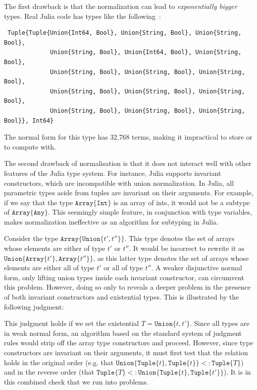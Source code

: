 \documentclass[a4paper,english]{lipics-v2019}
\newcommand{\xt}[1]{\texttt{#1}}
\newcommand{\union}[2]{\xt{Union\{}#1,#2\xt{\}}}
\newcommand{\tuple}[1]{\xt{Tuple\{}#1\xt{\}}}
\newcommand{\arrayt}[1]{\xt{Array\{}#1\xt{\}}}
\begin{document}
The first drawback is that the normalization can lead to \emph{exponentially
bigger} types. Real Julia code has types like the following~\cite{DBLP:NardelliBPCBV18}:

\begin{small}
\begin{verbatim}
 Tuple{Tuple{Union{Int64, Bool}, Union{String, Bool}, Union{String, Bool}, 
             Union{String, Bool}, Union{Int64, Bool}, Union{String, Bool}, 
             Union{String, Bool}, Union{String, Bool}, Union{String, Bool}, 
             Union{String, Bool}, Union{String, Bool}, Union{String, Bool}, 
             Union{String, Bool}, Union{String, Bool}, Union{String, Bool}}, Int64}
\end{verbatim}
\end{small}

\noindent The normal form for this type has 32,768 terms, making it impractical
to store or to compute with.

The second drawback of normalisation is that it does not interact well with
other features of the Julia type system. For instance, Julia supports invariant
constructors, which are incompatible with union normalization. In Julia, all 
parametric types aside from tuples are invariant on their arguments. For example,
if we say that the type $\arrayt{\xt{Int}}$ is an array of ints, it would not
be a subtype of $\arrayt{\xt{Any}}$. This seemingly simple feature, in conjunction
with type variables, makes normalization ineffective as an algorithm for subtyping
in Julia.

Consider the type {\small \(\arrayt{\union{t'}{t''}}\)}. This type denotes the set
of arrays whose elements are either of type {\small $t'$} or {\small   $t''$}.
It would be incorrect to rewrite it as {\small
\(\union{\arrayt{t'}}{\arrayt{t''}}\)}, as this latter type denotes the set of
arrays whose elements are either all of type {\small $t'$} or all of type
{\small$t''$}. A weaker disjunctive normal form, only lifting union types
inside each invariant constructor, can circumvent this problem. However, doing
so only to reveals a deeper problem in the presence of both invariant
constructors and {existential types}. This is illustrated by the following judgment:

%
\vspace{-3mm}{\small\[
  \arrayt{\union{\tuple{t}}{\tuple{t'}}} \ \ <:\ \ \exists T\,.\, \arrayt{\tuple{T}}
\]}\vspace{-3mm}
%

\noindent This judgment holds if we set the existential {\small$T=\union{t}{t'}$}.
Since all types are in weak normal form, an algorithm based on the standard
system of judgment rules would strip off the array type constructors and proceed.
However, since type constructors are invariant on their arguments, it must first test
that the relation holds in the original order (e.g. that $\union{\tuple{t}}{\tuple{t}} <: \tuple{T}$) 
and in the reverse order (that $\tuple{T} <: \union{\tuple{t}}{\tuple{t'}}$). It is in
this combined check that we run into problems.
\end{document}
